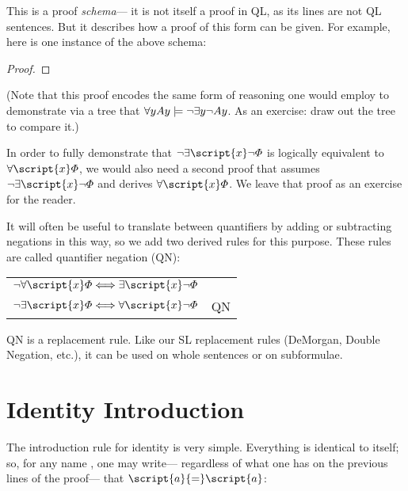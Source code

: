 This is a proof \emph{schema}--- it is not itself a proof in QL, as its lines are not QL sentences. But it describes how a proof of this form can be given. For example, here is one instance of the above schema:


\begin{proof}
	 
	\open
		\open
			\open
			\close
		\close
	\close
\end{proof}

(Note that this proof encodes the same form of reasoning one would employ to demonstrate via a tree that $\forall y Ay \models \neg \exists y \neg Ay$. As an exercise: draw out the tree to compare it.)

In order to fully demonstrate that $\enot\exists \script{x}\enot\metaA{}$ is logically equivalent to $\forall \script{x}\metaA{}$, we would also need a second proof that assumes $\enot\exists \script{x}\enot\metaA{}$ and derives $\forall \script{x}\metaA{}$. We leave that proof as an exercise for the reader.

It will often be useful to translate between quantifiers by adding or subtracting negations in this way, so we add two derived rules for this purpose. These rules are called quantifier negation (QN):
\begin{center}
\begin{tabular}{rl}
$\enot\forall\script{x}\metaA{} \Longleftrightarrow \exists\script{x}\enot\metaA{}$\\
$\enot\exists\script{x}\metaA{} \Longleftrightarrow \forall\script{x}\enot\metaA{}$
& QN
\end{tabular}
\end{center}
QN is a replacement rule. Like our SL replacement rules (DeMorgan, Double Negation, etc.), it can be used on whole sentences or on subformulae.

\section{Identity Introduction}

The introduction rule for identity is very simple. Everything is identical to itself; so, for any name , one may write--- regardless of what one has on the previous lines of the proof--- that $\script{a}{=}\script{a}$:

